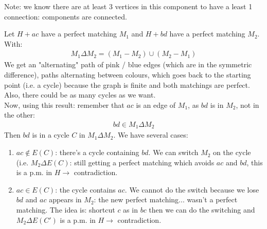 		Note: we know there are at least 3 vertices in this component to have a least 1 connection: components are connected.

\bigskip
Let $H + ac$ have a perfect matching $M_1$ and $H + bd $ have a perfect matching $M_2$.
			With:
			\begin{eqnarray}
				M_1 \Delta M_2 = (M_1 - M_2) \cup (M_2 - M_1)
			\end{eqnarray}
			We get an "alternating" path of pink / blue edges (which are in the symmetric difference), paths alternating between colours, which goes back to the starting point (i.e. a cycle) because the graph is finite and both matchings are perfect. Also, there could be as many cycles as we want. \\
			
			Now, using this result: remember that $ac$ is an edge of $M_1$, as $bd$ is in $M_2$, not in the other:
			\begin{eqnarray}
				bd \in M_1 \Delta M_2
			\end{eqnarray}
			Then $bd$ is in a cycle $C$ in $M_1 \Delta M_2$.
			We have several cases:
			\begin{enumerate}
				\item $ac \notin E(C)$: there's a cycle containing $bd$. We can switch $M_2$ on the cycle (i.e. $M_2 \Delta E(C)$: still getting a perfect matching which avoids $ac$ and $bd$, this is a p.m. in $H \longrightarrow $ contradiction.
				\item $ac \in E(C)$: the cycle contains $ac$. We cannot do the switch because we lose $bd$ and $ac$ appears in $M_2$: the new perfect matching... wasn't a perfect matching. The idea is: shortcut $c$ as in $bc$ then we can do the switching and $M_2 \Delta E(C')$ is a p.m. in $H \longrightarrow$ contradiction.
			\end{enumerate}
			

